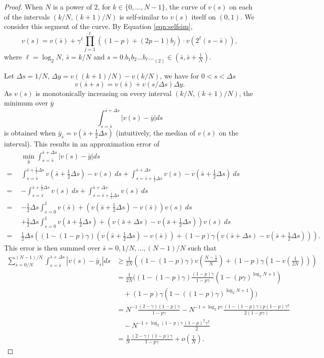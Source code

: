 \documentclass{article}
\theoremstyle{named}
\begin{document}
\begin{proof}
When $N$ is a power of $2$,
for $k\in \{0,\dots,N-1\}$, the curve of $v(s)$ on each of the intervals $(k/N, (k+1)/N)$ is self-similar to $v(s)$ itself on $(0,1)$. We consider this segment of the curve. By Equation \eqref{eqn:selfsim}, 
\[
v(s) = v(\bar s) + \gamma^{\ell}\prod_{j=1}^{\ell}((1-p)+(2p-1)b_j)\cdot v(2^\ell (s-\bar s)),
\]
where $\ell=\log_2N$, $\bar s=k/N$ and $s = 0.{b_1b_2\dots b_\ell \ldots}_{(2)}\in (\bar s,\bar s+\frac{1}{N})$.

Let $\Delta s = 1/N$, $\Delta y = v((k+1)/N) - v(k/N)$, we have for $0<s<\Delta s$
\[
v(\bar s + s) = v(\bar s) + v(s/\Delta s)\Delta y. 
\]
As $v(s)$ is monotonically increasing on every interval $(k/N, (k+1)/N)$, the minimum over $\bar y$
\[ 
\int_{s=\bar s}^{\bar s + \Delta s} \left| v(s)-\bar y \right| ds 
\]
is obtained when $\bar y_{\bar s} = v(\bar s + \frac{1}{2}\Delta s)$ (intuitively, the median of $v(s)$ on the interval). This results in an approximation error of
\begin{align*}
& \min_{\bar y}\int_{s=\bar s}^{\bar s + \Delta s} \left| v(s)-\bar y \right| ds\\
=\ & \int_{s=\bar s}^{\bar s + \frac{1}{2}\Delta s} v(\bar s + \frac{1}{2}\Delta s) - v(s)\ ds + \int_{s=\bar s + \frac{1}{2}\Delta s}^{\bar s + \Delta s} v(s) - v(\bar s + \frac{1}{2}\Delta s) \ ds\\
=\ & - \int_{s=\bar s}^{\bar s + \frac{1}{2}\Delta s} v(s)\ ds + \int_{s=\bar s + \frac{1}{2}\Delta s}^{\bar s + \Delta s} v(s)\ ds\\
=\ & -\frac{1}{2}\Delta s \int_{s=0}^1 v(\bar s) + (v(\bar s + \frac{1}{2}\Delta s) - v(\bar s)) v(s)\ ds\\
& + \frac{1}{2}\Delta s \int_{s=0}^1 v(\bar s + \frac{1}{2}\Delta s) + (v(\bar s + \Delta s) - v(\bar s + \frac{1}{2}\Delta s)) v(s)\ ds\\
=\ \ & \frac{1}{2}\Delta s ((1-(1-p)\gamma) (v(\bar s+\frac{1}{2}\Delta s)-v(\bar s))+(1-p)\gamma (v(\bar s+\Delta s)-v(\bar s+\frac{1}{2}\Delta s))).
\end{align*}
This error is then summed over $\bar s = 0, 1/N, \ldots, (N-1)/N$ such that
\begin{align*}
\sum_{\bar s=0/N}^{(N-1)/N}\int_{s=\bar s}^{\bar s + \Delta s} \left| v(s)-\bar y_{\bar s} \right| ds & \ge \frac{1}{2N}((1-(1-p)\gamma)v(\frac{N-\frac{1}{2}}{N}) + (1-p)\gamma (1-v(\frac{1}{2N})))\\
& = \frac{1}{2N}((1-(1-p)\gamma)\frac{(1-p)\gamma}{1-p\gamma}(1-(p\gamma)^{\log_2N+1})\\
&\quad + (1-p)\gamma (1-((1-p)\gamma)^{\log_2N+1}))\\
& = N^{-1}\frac{(2-\gamma)(1-p)\gamma}{1-p\gamma} - N^{-1+\log_2 p\gamma}\frac{(1-(1-p)\gamma)p(1-p)\gamma^2}{2(1-p\gamma)}\\
&\quad - N^{-1+\log_2 (1-p)\gamma} \frac{(1-p)^2\gamma^2}{2} \\
& = \frac{1}{N}\frac{(2-\gamma)(1-p)\gamma}{1-p\gamma} + o(\frac{1}{N}).\tag*{\qedhere}
\end{align*}
\end{proof}
\end{document}
